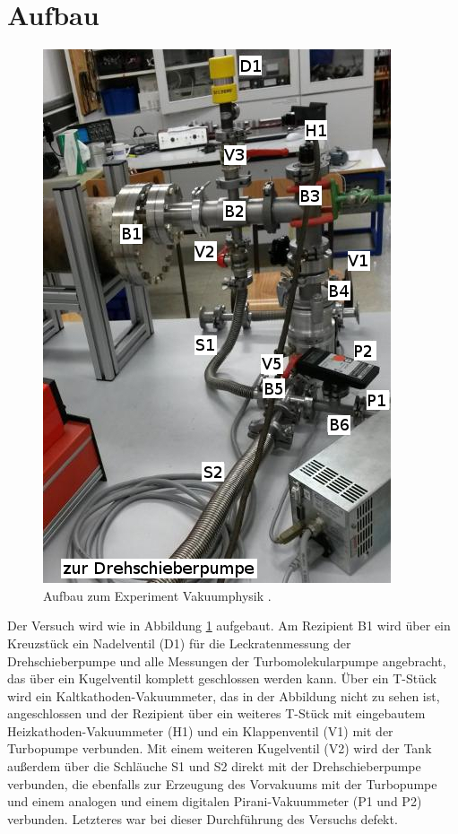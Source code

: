 
\section{Aufbau}
\label{sec:Aufbau}

\begin{figure}
\vspace{-0.5cm}
\includegraphics[scale=0.5]{content/images/Aufbau2.jpg}
\caption{Aufbau zum Experiment Vakuumphysik \cite{V70}.}
\label{fig:Aufbau}
\end{figure}

Der Versuch wird wie in Abbildung \ref{fig:Aufbau} aufgebaut. Am Rezipient B1 wird über ein Kreuzstück ein Nadelventil (D1) für die Leckratenmessung der Drehschieberpumpe und alle Messungen der Turbomolekularpumpe angebracht, das über ein Kugelventil komplett geschlossen werden kann. Über ein T-Stück wird ein Kaltkathoden-Vakuummeter, das in der Abbildung nicht zu sehen ist, angeschlossen und der Rezipient über ein weiteres T-Stück mit eingebautem Heizkathoden-Vakuummeter (H1) und ein Klappenventil (V1) mit der Turbopumpe verbunden. Mit einem weiteren Kugelventil (V2) wird der Tank außerdem über die Schläuche S1 und S2 direkt mit der Drehschieberpumpe verbunden, die ebenfalls zur Erzeugung des Vorvakuums mit der Turbopumpe und einem analogen und einem digitalen Pirani-Vakuummeter (P1 und P2) verbunden. Letzteres war bei dieser Durchführung des Versuchs defekt.